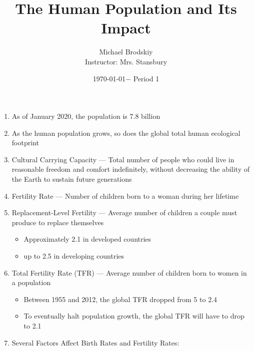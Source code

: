\documentclass[12pt]{article}
\title{The Human Population and Its Impact}
\date{\today $-$ Period 1}
\author{Michael Brodskiy\\ \small Instructor: Mrs. Stansbury}
\begin{document}
\maketitle

\begin{enumerate}

  \item As of January 2020, the population is 7.8 billion

  \item As the human population grows, so does the global total human ecological footprint

  \item Cultural Carrying Capacity — Total number of people who could live in reasonable freedom and comfort indefinitely, without decreasing the ability of the Earth to sustain future generations

  \item Fertility Rate — Number of children born to a woman during her lifetime

  \item Replacement-Level Fertility — Average number of children a couple must produce to replace themselves 

    \begin{itemize}

      \item Approximately 2.1 in developed countries

      \item up to 2.5 in developing countries

    \end{itemize}

  \item Total Fertility Rate (TFR) — Average number of children born to women in a population

    \begin{itemize}

      \item Between 1955 and 2012, the global TFR dropped from 5 to 2.4

      \item To eventually halt population growth, the global TFR will have to drop to 2.1

    \end{itemize}

  \item Several Factors Affect Birth Rates and Fertility Rates:

    \begin{itemize}


\end{itemize}
\end{enumerate}
\end{document}
